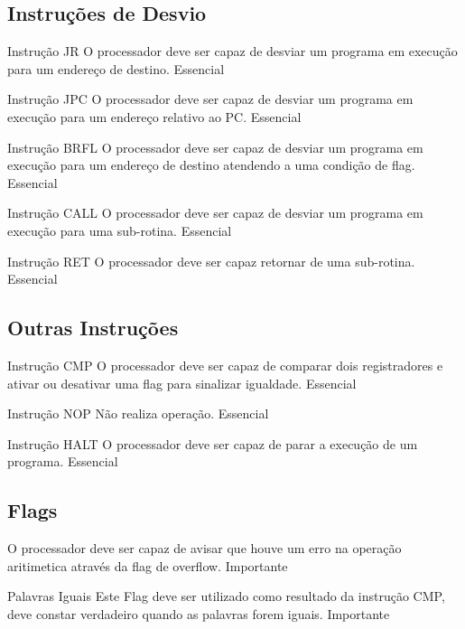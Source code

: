 \documentclass{article}
\begin{document}
    \subsection{Instruções de Desvio}
  
    \begin{functional}
      \requirement
      {Instrução JR}
      {O processador deve ser capaz de desviar um programa em execução para um endereço de destino.}
      {Essencial}

      \requirement
      {Instrução JPC}
      {O processador deve ser capaz de desviar um programa em execução para um endereço relativo ao PC.}
      {Essencial}
      
      \requirement
      {Instrução BRFL}
      {O processador deve ser capaz de desviar um programa em execução para um endereço de destino atendendo a uma condição de flag.}
      {Essencial}
      
      \requirement
      {Instrução CALL}
      {O processador deve ser capaz de desviar um programa em execução para uma sub-rotina.}
      {Essencial}
      
      \requirement
      {Instrução RET}
      {O processador deve ser capaz retornar de uma sub-rotina.}
      {Essencial}

    \end{functional}
    
    \subsection{Outras Instruções}
  
    \begin{functional}
      \requirement
      {Instrução CMP}
      {O processador deve ser capaz de comparar dois registradores e ativar ou desativar uma flag para sinalizar igualdade.}
      {Essencial}

      \requirement
      {Instrução NOP}
      {Não realiza operação.}
      {Essencial}
      
      \requirement
      {Instrução HALT}
      {O processador deve ser capaz de parar a execução de um programa.}
      {Essencial}

    \end{functional}
    
    \subsection{Flags}
    
    \begin{functional}
    
      {O processador deve ser capaz de avisar que houve um erro na operação aritimetica através da flag de overflow.}
      {Importante}
      
      \requirement
      {Palavras Iguais}
      {Este Flag deve ser utilizado como resultado da instrução CMP, deve constar verdadeiro quando as palavras forem iguais.}
      {Importante}
    
     \end{functional}
 
\end{document}
